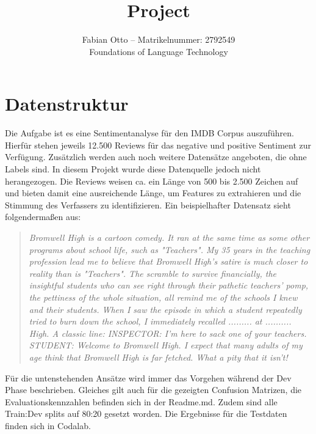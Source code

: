 \documentclass[12pt]{scrartcl}
\begin{document}
    \title{Project}
    \author{Fabian Otto -- Matrikelnummer: 2792549\\
    Foundations of Language Technology}
    \maketitle

    \section{Datenstruktur}

    Die Aufgabe ist es eine Sentimentanalyse für den IMDB Corpus auszuführen.
    Hierfür stehen jeweils 12.500 Reviews für das negative und positive Sentiment zur Verfügung.
    Zusätzlich werden auch noch weitere Datensätze angeboten, die ohne Labels sind.
    In diesem Projekt wurde diese Datenquelle jedoch nicht herangezogen.
    Die Reviews weisen ca. ein Länge von 500 bis 2.500 Zeichen auf und bieten damit eine ausreichende Länge, um Features zu extrahieren und die Stimmung des Verfassers zu identifizieren.
    Ein beispielhafter Datensatz sieht folgendermaßen aus:
    \begin{quote}
        \textit{
        Bromwell High is a cartoon comedy.
        It ran at the same time as some other programs about school life, such as "Teachers".
        My 35 years in the teaching profession lead me to believe that Bromwell High's satire is much closer to reality than is "Teachers".
        The scramble to survive financially, the insightful students who can see right through their pathetic teachers' pomp,
        the pettiness of the whole situation, all remind me of the schools I knew and their students.
        When I saw the episode in which a student repeatedly tried to burn down the school, I immediately recalled ......... at .......... High.
        A classic line: INSPECTOR: I'm here to sack one of your teachers.
        STUDENT: Welcome to Bromwell High.
        I expect that many adults of my age think that Bromwell High is far fetched.
        What a pity that it isn't!
        }
    \end{quote}

    Für die untenstehenden Ansätze wird immer das Vorgehen während der Dev Phase beschrieben.
    Gleiches gilt auch für die gezeigten Confusion Matrizen, die Evaluationskennzahlen befinden sich in der Readme.md.
    Zudem sind alle Train:Dev splits auf 80:20 gesetzt worden.
    Die Ergebnisse für die Testdaten finden sich in Codalab.
\end{document}
